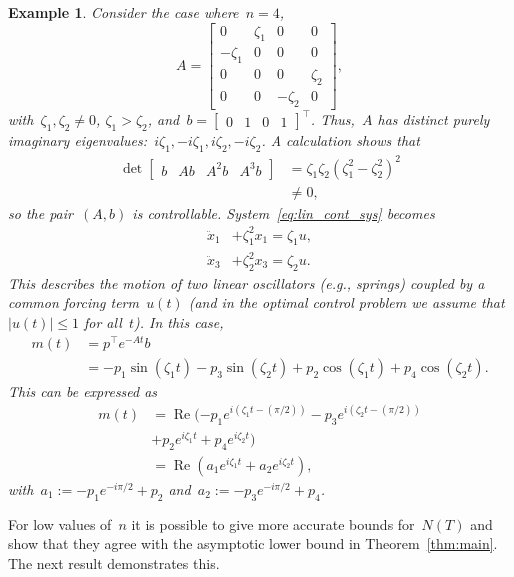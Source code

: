 \documentclass[final ]{IEEEtran}
\newcommand{\real}{\operatorname{Re}}
\newtheorem{example}{Example}
\begin{document}
 
\begin{example}
Consider  the case where~$n=4$,
\[
A=\begin{bmatrix}
    0 & \zeta_1 & 0 &0 \\
    -\zeta_1 &0 &0 &0\\
    0&0&0&\zeta_2\\
    0 & 0& -\zeta_2 &0 
\end{bmatrix},
\]
with~$\zeta_1,\zeta_2\not =0$,  
$\zeta_1>\zeta_2$,
and~$b=\begin{bmatrix}
   0& 1&0&1
\end{bmatrix}^\top$. 
Thus,~$A$ has distinct
purely imaginary eigenvalues:~$i\zeta_1,-i\zeta_1,i\zeta_2,-i\zeta_2$. 
A calculation shows that  
\begin{align*}
\det \begin{bmatrix}
    b& Ab & A^2b&A^3b
\end{bmatrix} &=\zeta_1 \zeta_2 (\zeta_1^2-\zeta_2^2)^2\\&\not=0,
\end{align*}
so the pair~$(A,b)$ is controllable. 
System~\eqref{eq:lin_cont_sys} becomes
\begin{align}\label{oscillators}
\ddot x_1 &+\zeta_1^2 x_1=\zeta_1 u,\nonumber\\
\ddot x_3&+\zeta_2^2 x_3=\zeta_2 u. \nonumber
\end{align}
This describes  the motion of two  linear oscillators (e.g., springs)
coupled  by a common  forcing term~$u(t) $ (and in the optimal control problem we assume that~$|u(t)|\leq 1$ for all~$t$).
In this case, 
\begin{align*}
  m(t)&=p^\top  e^{-At} b \\
    &= -p_1\sin(\zeta_1 t) -p_3\sin(\zeta_2 t) 
     +p_2 \cos(\zeta_1 t) +p_4 \cos(\zeta_2 t) .
\end{align*}
This can    be expressed as
\begin{align*}
     m(t)&= \real ( - p_1 e^{i(\zeta_1  t-(\pi/2))}  -p_3 e^{i(\zeta_2 t-(\pi/2))}\\&+p_2  e^{i \zeta_1 t}+p_4
  e^{i \zeta_2 t} )   \\
  &=\real (a_1 e^{i\zeta_1 t} +  a_2 e^{i\zeta_2 t}
  ) ,
\end{align*}
 with~$a_1:=-p_1 e^{-i\pi/2}+p_2$ and~$a_2:=-p_3 e^{-i\pi/2} +p_4 $.    
\end{example}


For low values of~$n$  it is possible to give more accurate bounds
for~$N(T)$ and show that they agree with the asymptotic lower bound in Theorem~\ref{thm:main}.
The next result  demonstrates this. 
\end{document}
